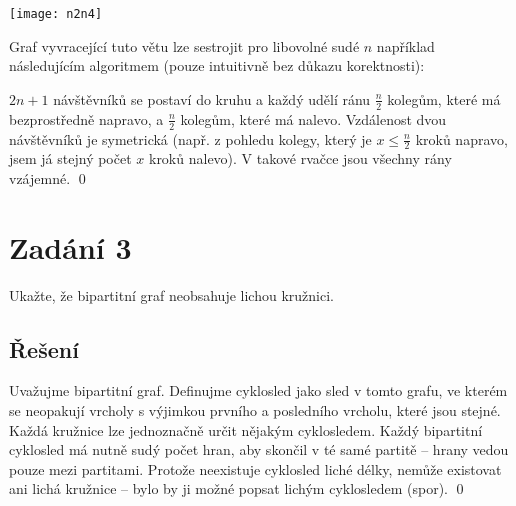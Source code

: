 \documentclass{article}
\begin{document}
\begin{center}
    \texttt{[image: n2n4]}
\end{center}

Graf vyvracející tuto větu lze sestrojit pro libovolné sudé $n$ například následujícím algoritmem (pouze intuitivně bez důkazu korektnosti):

$2n + 1$ návštěvníků se postaví do kruhu a každý udělí ránu $\frac{n}{2}$ kolegům, které má bezprostředně napravo, a $\frac{n}{2}$ kolegům, které má nalevo. Vzdálenost dvou návštěvníků je symetrická (např. z pohledu kolegy, který je $x \le \frac{n}{2}$ kroků napravo, jsem já stejný počet $x$ kroků nalevo). V takové rvačce jsou všechny rány vzájemné.
\qed

\newpage
\section*{Zadání 3}

Ukažte, že bipartitní graf neobsahuje lichou kružnici.

\subsection*{Řešení}

Uvažujme bipartitní graf. Definujme cyklosled jako sled v tomto grafu, ve kterém se neopakují vrcholy s výjimkou prvního a posledního vrcholu, které jsou stejné.
Každá kružnice lze jednoznačně určit nějakým cyklosledem. Každý bipartitní cyklosled má nutně sudý počet hran, aby skončil v té samé partitě -- hrany vedou pouze mezi partitami.
Protože neexistuje cyklosled liché délky, nemůže existovat ani lichá kružnice -- bylo by ji možné popsat lichým cyklosledem (spor).
\qed
\end{document}
